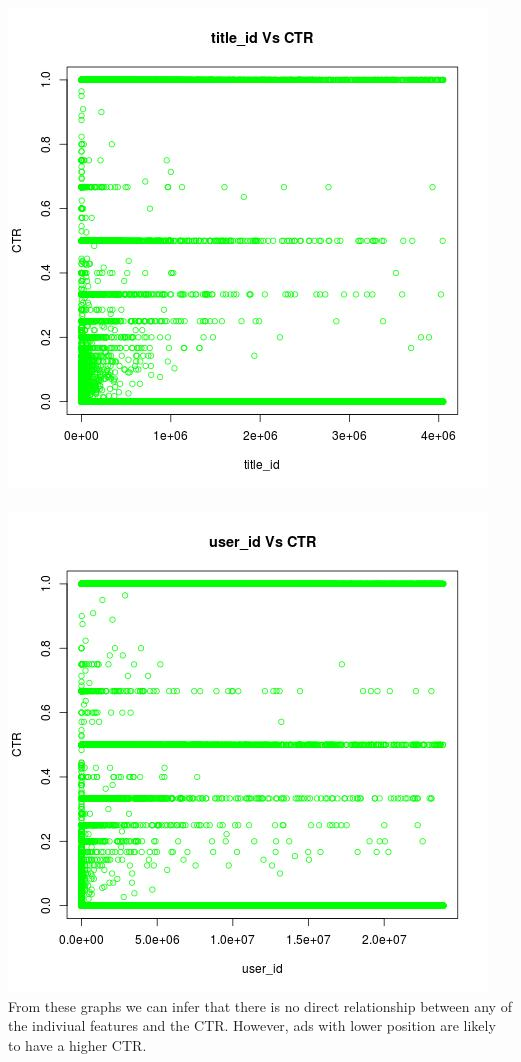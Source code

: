 \documentclass[10pt]{article}
\begin{document}
\includegraphics[scale=0.5]{title_id_Vs_CTR}\\\\
\includegraphics[scale=0.5]{user_id_Vs_CTR}\\
From these graphs we can infer that there is no direct relationship between any of the indiviual features and the CTR. However, ads with lower position are likely to have a higher CTR.
\end{document}

